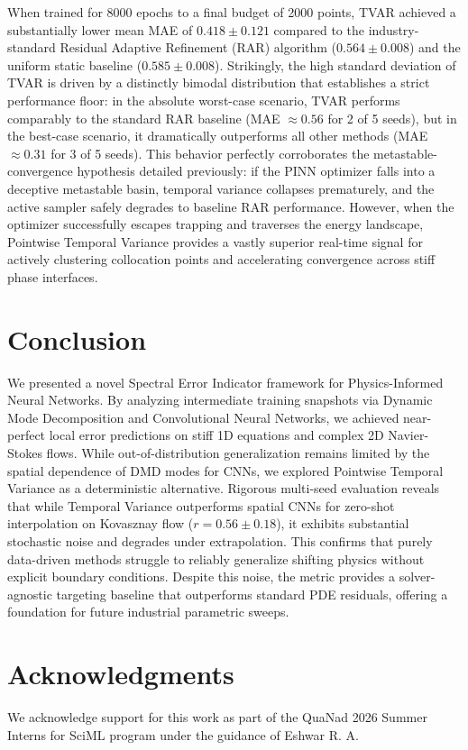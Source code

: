 \documentclass{article}
\begin{document}
When trained for 8000 epochs to a final budget of 2000 points, TVAR achieved a substantially lower mean MAE of $\mathbf{0.418 \pm 0.121}$ compared to the industry-standard Residual Adaptive Refinement (RAR) algorithm ($0.564 \pm 0.008$) and the uniform static baseline ($0.585 \pm 0.008$). Strikingly, the high standard deviation of TVAR is driven by a distinctly bimodal distribution that establishes a strict performance floor: in the absolute worst-case scenario, TVAR performs comparably to the standard RAR baseline (MAE $\approx 0.56$ for 2 of 5 seeds), but in the best-case scenario, it dramatically outperforms all other methods (MAE $\approx 0.31$ for 3 of 5 seeds). This behavior perfectly corroborates the metastable-convergence hypothesis detailed previously: if the PINN optimizer falls into a deceptive metastable basin, temporal variance collapses prematurely, and the active sampler safely degrades to baseline RAR performance. However, when the optimizer successfully escapes trapping and traverses the energy landscape, Pointwise Temporal Variance provides a vastly superior real-time signal for actively clustering collocation points and accelerating convergence across stiff phase interfaces.

\section{Conclusion}
We presented a novel Spectral Error Indicator framework for Physics-Informed Neural Networks. By analyzing intermediate training snapshots via Dynamic Mode Decomposition and Convolutional Neural Networks, we achieved near-perfect local error predictions on stiff 1D equations and complex 2D Navier-Stokes flows. While out-of-distribution generalization remains limited by the spatial dependence of DMD modes for CNNs, we explored Pointwise Temporal Variance as a deterministic alternative. Rigorous multi-seed evaluation reveals that while Temporal Variance outperforms spatial CNNs for zero-shot interpolation on Kovasznay flow ($r = 0.56 \pm 0.18$), it exhibits substantial stochastic noise and degrades under extrapolation. This confirms that purely data-driven methods struggle to reliably generalize shifting physics without explicit boundary conditions. Despite this noise, the metric provides a solver-agnostic targeting baseline that outperforms standard PDE residuals, offering a foundation for future industrial parametric sweeps. 

\section*{Acknowledgments}
We acknowledge support for this work as part of the QuaNad 2026 Summer Interns for SciML program under the guidance of Eshwar R. A.

  
  
\end{document}
